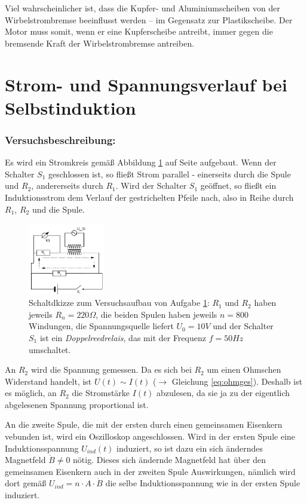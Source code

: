 Viel wahrscheinlicher ist, dass die Kupfer- und Aluminiumscheiben von der Wirbelstrombremse beeinflusst werden -- im Gegensatz zur Plastikscheibe. Der Motor muss somit, wenn er eine Kupferscheibe antreibt, immer gegen die bremsende Kraft der Wirbelstrombremse antreiben.

\clearpage
		\section{Strom- und Spannungsverlauf bei Selbstinduktion}
		\label{seind}
		
		\subsubsection*{Versuchsbeschreibung:}
Es wird ein Stromkreis gemäß Abbildung \ref{schzk} auf Seite \pageref{schzk} aufgebaut. Wenn der Schalter \(S_1\) geschlossen ist, so fließt Strom parallel - einerseits durch die Spule und \(R_2\), andererseits durch \(R_1\). Wird der Schalter \(S_1\) geöffnet, so fließt ein Induktionsstrom dem Verlauf der gestrichelten Pfeile nach, also in Reihe durch \(R_1\), \(R_2\) und die Spule. 

\begin{figure}[hp]
\centering
\includegraphics[width=0.3\textwidth]{praktika/mat_praktika/sz1}
\caption{Schaltdkizze zum Versuchsaufbau von Aufgabe \ref{seind}: \(R_1\) und \(R_2\) haben jeweils \(R_n = 220 \Omega\), die beiden Spulen haben jeweils \(n = 800\) Windungen, die Spannungsquelle liefert \(U_0 = 10V\) und der Schalter \(S_1\) ist ein \textit{Doppelreedrelais}, das mit der Frequenz \(f = 50 Hz\) umschaltet.}
\label{schzk}
\end{figure}

		

An \(R_2\) wird die Spannung gemessen. Da es sich bei \(R_2\) um einen Ohmschen Widerstand handelt, ist \(U(t) \sim I(t)\) (\(\rightarrow\) Gleichung \ref{eq:ohmges}). Deshalb ist es möglich, an \(R_2\) die Stromstärke \(I(t)\) abzulesen, da sie ja zu der eigentlich abgelesenen Spannung proportional ist.

An die zweite Spule, die mit der ersten durch einen gemeinsamen Eisenkern vebunden ist, wird ein Oszilloskop angeschlossen. Wird in der ersten Spule eine Induktionsspannung \(U_{ind}(t)\) induziert, so ist dazu ein sich änderndes Magnetfeld \(\dot{B} \neq 0\) nötig. Dieses sich ändernde Magnetfeld hat über den gemeinsamen Eisenkern auch in der zweiten Spule Auswirkungen, nämlich wird dort gemäß \(U_{ind} = n \cdot A \cdot \dot{B}\) die selbe Induktionsspannung wie in der ersten Spule induziert.

